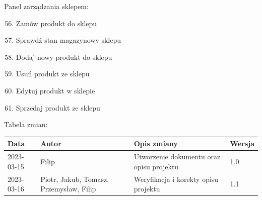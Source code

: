 \documentclass[
]{article}
\providecommand{\tightlist}{%
  \setlength{\itemsep}{0pt}\setlength{\parskip}{0pt}}
\begin{document}
{Panel zarządzania sklepem:}

\begin{enumerate}
\setcounter{enumi}{55}
\tightlist
\item
{Zamów produkt do sklepu}
\item
{Sprawdź stan magazynowy sklepu}
\item
{Dodaj nowy produkt do sklepu}
\item
{Usuń produkt ze sklepu}
\item
{Edytuj produkt w sklepie}
\item
{Sprzedaj produkt ze sklepu}
\end{enumerate}

{Tabela zmian:}

\begin{longtable}[]{@{}llll@{}}
\toprule
\begin{minipage}[b]{0.11\columnwidth}\raggedright
Data\strut
\end{minipage} & \begin{minipage}[b]{0.11\columnwidth}\raggedright
Autor\strut
\end{minipage} & \begin{minipage}[b]{0.11\columnwidth}\raggedright
Opis zmiany\strut
\end{minipage} & \begin{minipage}[b]{0.11\columnwidth}\raggedright
Wersja\strut
\end{minipage}\tabularnewline
\midrule

\endhead
\begin{minipage}[t]{0.11\columnwidth}\raggedright
2023-03-15\strut
\end{minipage} & \begin{minipage}[t]{0.11\columnwidth}\raggedright
Filip
\strut
\end{minipage} & \begin{minipage}[t]{0.11\columnwidth}\raggedright
Utworzenie dokumentu oraz opisu projektu
\strut
\end{minipage} & \begin{minipage}[t]{0.11\columnwidth}\raggedright
1.0
\strut
\end{minipage}\tabularnewline
\begin{minipage}[t]{0.11\columnwidth}\raggedright
2023-03-16\strut
\end{minipage} & \begin{minipage}[t]{0.11\columnwidth}\raggedright
Piotr, Jakub, Tomasz, Przemysław, Filip
\strut
\end{minipage} & \begin{minipage}[t]{0.11\columnwidth}\raggedright
Weryfikacja i korekty opisu projektu
\strut
\end{minipage} & \begin{minipage}[t]{0.11\columnwidth}\raggedright
1.1
\strut
\end{minipage}\tabularnewline

\bottomrule
\end{longtable}
\end{document}
